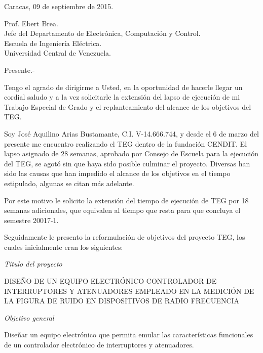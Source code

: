 \documentclass[paper=letter,oneside,fontsize=12pt, parskip=full]{article}
\begin{document}
	\begin{flushright}		

		Caracas, 09 de septiembre de 2015. \\
	
	\end{flushright}

	
	\begin{onehalfspace}
		\large
		Prof. Ebert Brea. \\
		Jefe del Departamento de Electrónica, Computación y Control. \\
		Escuela de Ingeniería Eléctrica. \\
		Universidad Central de Venezuela.	
	\end{onehalfspace}

	Presente.- 
	
	Tengo el agrado de dirigirme a Usted, en la oportunidad de hacerle llegar un cordial saludo y a la vez solicitarle la extensión del lapso de ejecución de mi Trabajo Especial de Grado y el replanteamiento del alcance de los objetivos del TEG.
	 
	Soy José Aquilino Arias Bustamante, C.I. V-14.666.744, y desde el 6 de marzo del presente me encuentro realizando el TEG dentro de la fundación CENDIT. El lapso asignado de 28 semanas, aprobado por Consejo de Escuela para la ejecución del TEG, se agotó sin que haya sido posible culminar el proyecto. Diversas han sido las causas que han impedido el alcance de los objetivos en el tiempo estipulado, algunas se citan más adelante. 
		
	Por este motivo le solicito la extensión del tiempo de ejecución de TEG por 18 semanas adicionales, que equivalen al tiempo que resta para que concluya el semestre 20017-1.
	
	Seguidamente le presento la reformulación de objetivos del proyecto TEG, los cuales inicialmente eran los siguientes:	
		
	\emph{Título del proyecto}
	
	\begin{center}
		DISEÑO DE UN EQUIPO ELECTRÓNICO CONTROLADOR DE
		INTERRUPTORES Y ATENUADORES EMPLEADO EN LA
		MEDICIÓN DE LA FIGURA DE RUIDO EN DISPOSITIVOS DE
		RADIO FRECUENCIA
	\end{center}	
	
	\emph{Objetivo general}
	
	Diseñar un equipo electrónico que permita emular las características funcionales de un
	controlador electrónico de interruptores y atenuadores.
	
\end{document}
